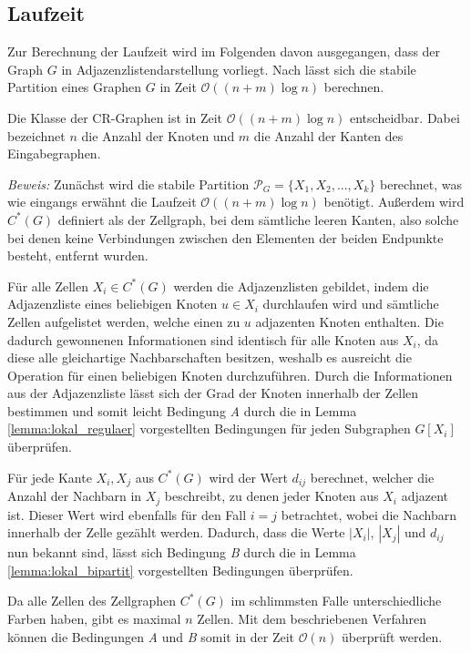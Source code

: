 \subsection{Laufzeit}
Zur Berechnung der Laufzeit wird im Folgenden davon ausgegangen, dass der Graph $G$ in Adjazenzlistendarstellung vorliegt.
Nach \cite{CARDON198285} lässt sich die stabile Partition eines Graphen $G$ in Zeit $\mathcal{O}((n+m)\log n)$ berechnen.

\begin{Theorem}
	Die Klasse der CR-Graphen ist in Zeit $\mathcal{O}((n+m)\log n)$ entscheidbar. Dabei bezeichnet $n$ die Anzahl der Knoten und $m$ die Anzahl der Kanten des Eingabegraphen.
\end{Theorem}

\emph{Beweis:} Zunächst wird die stabile Partition $\mathcal{P}_G=\{X_1,X_2,...,X_k\}$ berechnet, was wie eingangs erwähnt die Laufzeit $\mathcal{O}((n+m)\log n)$ benötigt.
Außerdem wird $C^*(G)$ definiert als der Zellgraph, bei dem sämtliche leeren Kanten, also solche bei denen keine Verbindungen zwischen den Elementen der beiden Endpunkte besteht, entfernt wurden.

Für alle Zellen $X_i\in C^*(G)$ werden die Adjazenzlisten gebildet, indem die Adjazenzliste eines beliebigen Knoten $u\in X_i$ durchlaufen wird und sämtliche Zellen aufgelistet werden, welche einen zu $u$ adjazenten Knoten enthalten.
Die dadurch gewonnenen Informationen sind identisch für alle Knoten aus $X_i$, da diese alle gleichartige Nachbarschaften besitzen, weshalb es ausreicht die Operation für einen beliebigen Knoten durchzuführen.
Durch die Informationen aus der Adjazenzliste lässt sich der Grad der Knoten innerhalb der Zellen bestimmen und somit leicht Bedingung \emph{A} durch die in Lemma \ref{lemma:lokal_regulaer} vorgestellten Bedingungen für jeden Subgraphen $G[X_i]$ überprüfen.

Für jede Kante ${X_i,X_j}$ aus $C^*(G)$ wird der Wert $d_{ij}$ berechnet, welcher die Anzahl der Nachbarn in $X_j$ beschreibt, zu denen jeder Knoten aus $X_i$ adjazent ist.
Dieser Wert wird ebenfalls für den Fall $i=j$ betrachtet, wobei die Nachbarn innerhalb der Zelle gezählt werden.
Dadurch, dass die Werte $|X_i|$, $|X_j|$ und $d_{ij}$ nun bekannt sind, lässt sich Bedingung \emph{B} durch die in Lemma \ref{lemma:lokal_bipartit} vorgestellten Bedingungen überprüfen.

Da alle Zellen des Zellgraphen $C^*(G)$ im schlimmsten Falle unterschiedliche Farben haben, gibt es maximal $n$ Zellen.
Mit dem beschriebenen Verfahren können die Bedingungen \emph{A} und \emph{B} somit in der Zeit $\mathcal{O}(n)$ überprüft werden.


